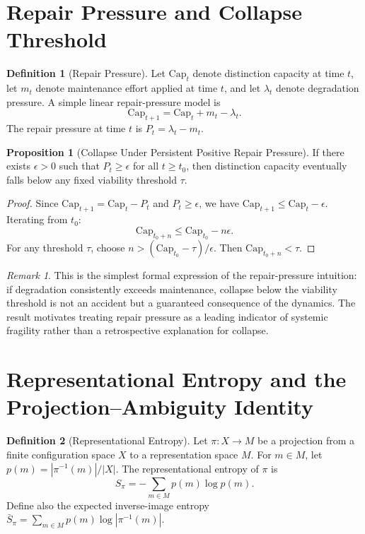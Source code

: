 \documentclass[11pt, oneside]{book}
\theoremstyle{definition}
\newtheorem{definition}{Definition}[chapter]
\newtheorem{proposition}{Proposition}[chapter]
\theoremstyle{remark}
\newtheorem{remark}{Remark}[chapter]
\begin{document}
\section{Repair Pressure and Collapse Threshold}

\begin{definition}[Repair Pressure]
Let $\mathrm{Cap}_t$ denote distinction capacity at time $t$, let $m_t$ denote maintenance effort applied at time $t$, and let $\lambda_t$ denote degradation pressure. A simple linear repair-pressure model is
\[
\mathrm{Cap}_{t+1} = \mathrm{Cap}_t + m_t - \lambda_t.
\]
The repair pressure at time $t$ is $P_t = \lambda_t - m_t$.
\end{definition}

\begin{proposition}[Collapse Under Persistent Positive Repair Pressure]
If there exists $\epsilon>0$ such that $P_t\geq \epsilon$ for all $t\geq t_0$, then distinction capacity eventually falls below any fixed viability threshold $\tau$.
\end{proposition}

\begin{proof}
Since $\mathrm{Cap}_{t+1} = \mathrm{Cap}_t - P_t$ and $P_t \geq \epsilon$, we have $\mathrm{Cap}_{t+1} \leq \mathrm{Cap}_t - \epsilon$. Iterating from $t_0$:
\[
\mathrm{Cap}_{t_0+n} \leq \mathrm{Cap}_{t_0} - n\epsilon.
\]
For any threshold $\tau$, choose $n > (\mathrm{Cap}_{t_0} - \tau)/\epsilon$. Then $\mathrm{Cap}_{t_0+n} < \tau$.
\end{proof}

\begin{remark}
This is the simplest formal expression of the repair-pressure intuition: if degradation consistently exceeds maintenance, collapse below the viability threshold is not an accident but a guaranteed consequence of the dynamics. The result motivates treating repair pressure as a leading indicator of systemic fragility rather than a retrospective explanation for collapse.
\end{remark}

\section{Representational Entropy and the Projection--Ambiguity Identity}

\begin{definition}[Representational Entropy]
Let $\pi:X\to M$ be a projection from a finite configuration space $X$ to a representation space $M$. For $m\in M$, let $p(m) = |\pi^{-1}(m)|/|X|$. The representational entropy of $\pi$ is
\[
S_\pi = -\sum_{m\in M} p(m)\log p(m).
\]
Define also the expected inverse-image entropy $\bar{S}_{\pi} = \sum_{m\in M}p(m)\log|\pi^{-1}(m)|$.
\end{definition}
\end{document}
